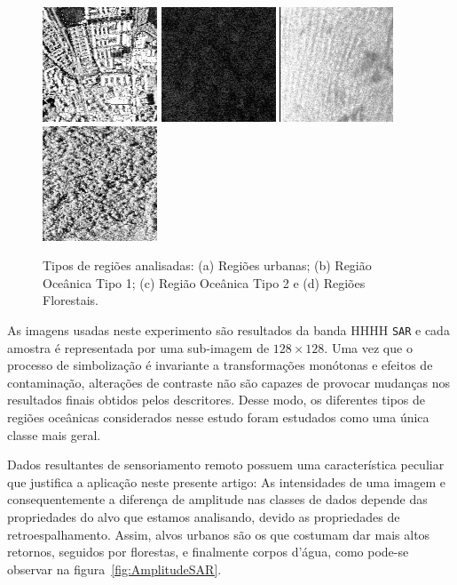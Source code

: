 \documentclass[12pt]{article}
\begin{document}
\begin{figure}[!h]
\centering
\includegraphics[width=.23\linewidth]{Figures/munichUrban.png}
\includegraphics[width=.23\linewidth]{Figures/Cape1.png}
\includegraphics[width=.23\linewidth]{Figures/Cape2.png}
\includegraphics[width=.23\linewidth]{Figures/guatemalaflorest.png}
\caption{Tipos de regiões analisadas: (a) Regiões urbanas; (b) Região Oceânica Tipo 1; (c) Região Oceânica Tipo 2 e (d) Regiões Florestais.}\label{fig:RegioesSAR}
\end{figure} 

As imagens usadas neste experimento são resultados da banda HHHH \texttt{SAR} e cada amostra é representada por uma sub-imagem de $128 \times 128$.
Uma vez que o processo de simbolização é invariante a 
transformações monótonas e efeitos de contaminação, alterações de contraste não são capazes de provocar mudanças nos resultados finais obtidos pelos descritores. Desse modo, os diferentes tipos de regiões oceânicas considerados nesse estudo foram estudados como uma única classe mais geral.

Dados resultantes de sensoriamento remoto possuem uma característica peculiar que justifica a aplicação neste presente artigo: As intensidades de uma imagem e consequentemente a diferença de amplitude nas classes de dados depende das propriedades do alvo que estamos analisando, devido as propriedades de retroespalhamento. 
Assim, alvos urbanos são os que costumam dar mais altos retornos, seguidos por florestas, e finalmente corpos d’água, como pode-se observar na figura~\ref{fig:AmplitudeSAR}.
\end{document}

